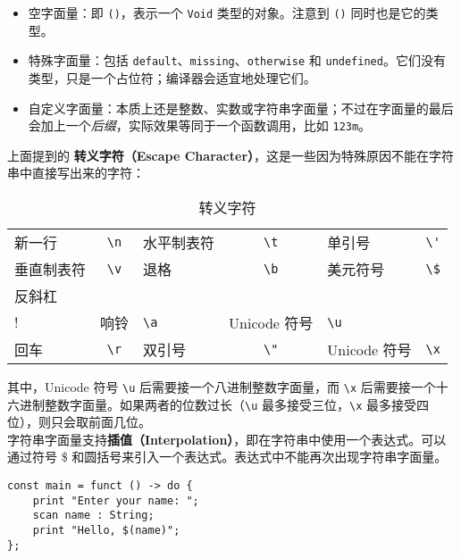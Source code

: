 \begin{itemize}
    \item 空字面量：即 \lstinline!()!，表示一个 \lstinline!Void! 类型的对象。注意到 \lstinline!()! 同时也是它的类型。

    \item 特殊字面量：包括 \lstinline!default!、\lstinline!missing!、\lstinline!otherwise! 和 \lstinline!undefined!。它们没有类型，只是一个占位符；编译器会适宜地处理它们。

    \item 自定义字面量：本质上还是整数、实数或字符串字面量；不过在字面量的最后会加上一个\emph{后缀}，实际效果等同于一个函数调用，比如 \lstinline!123m!。
\end{itemize}

\phantom{ }

上面提到的 \textbf{转义字符（Escape Character）}，这是一些因为特殊原因不能在字符串中直接写出来的字符：

\begin{table}[h]
    \centering
    \begin{tabular}{l c l c l c}
        新一行 & \lstinline!\n! & 水平制表符 & \lstinline!\t! & 单引号 & \lstinline!\'! \\
        垂直制表符 & \lstinline!\v! & 退格 & \lstinline!\b! & 美元符号 & \lstinline!\$! \\
        反斜杠 & \lstinline!\\! & 响铃 & \lstinline!\a! & Unicode 符号 & \lstinline!\u! \\
        回车 & \lstinline!\r! & 双引号 & \lstinline!\"! & Unicode 符号 & \lstinline!\x! \\
    \end{tabular}
    \caption{转义字符}
    \label{tab:escape-characters}
\end{table}

其中，Unicode 符号 \lstinline!\u! 后需要接一个八进制整数字面量，而 \lstinline!\x! 后需要接一个十六进制整数字面量。如果两者的位数过长（\lstinline!\u! 最多接受三位，\lstinline!\x! 最多接受四位），则只会取前面几位。 \\

字符串字面量支持\textbf{插值（Interpolation）}，即在字符串中使用一个表达式。可以通过符号 \$ 和圆括号来引入一个表达式。表达式中不能再次出现字符串字面量。

\begin{lstlisting}
const main = funct () -> do {
    print "Enter your name: ";
    scan name : String;
    print "Hello, $(name)";
};
\end{lstlisting}

